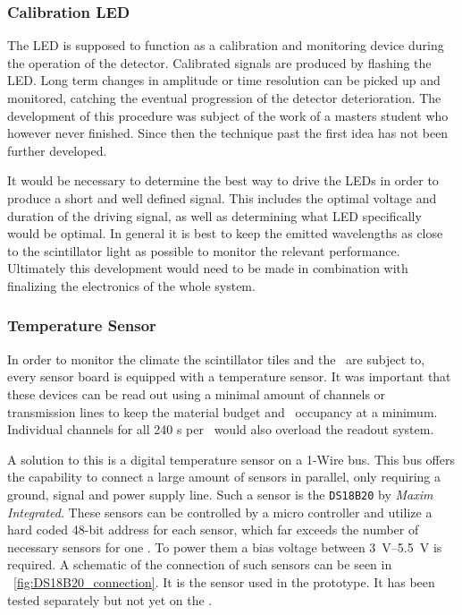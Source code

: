 \documentclass[../BTOF_summary.tex]{subfiles}
\begin{document}
\subsubsection*{Calibration LED}
The LED is supposed to function as a calibration and monitoring device during the operation of the detector.
Calibrated signals are produced by flashing the LED.
Long term changes in amplitude or time resolution can be picked up and monitored, catching the eventual progression of the detector deterioration.
The development of this procedure was subject of the work of a masters student who however never finished.
Since then the technique past the first idea has not been further developed.

It would be necessary to determine the best way to drive the LEDs in order to produce a short and well defined signal. 
This includes the optimal voltage and duration of the driving signal, as well as determining what LED specifically would be optimal.
In general it is best to keep the emitted wavelengths as close to the scintillator light as possible to monitor the relevant performance.
Ultimately this development would need to be made in combination with finalizing the electronics of the whole system.

\subsubsection*{Temperature Sensor}
In order to monitor the climate the scintillator tiles and the \sipms\ are subject to, every sensor board is equipped with a temperature sensor. It was important that these devices can be read out using a minimal amount of channels or transmission lines to keep the material budget and \railboard\ occupancy at a minimum.
Individual channels for all 240 \sensorboard s per \sm\ would also overload the readout system.

A solution to this is a digital temperature sensor on a 1-Wire bus.
This bus offers the capability to connect a large amount of sensors in parallel, only requiring a ground, signal and power supply line.
Such a sensor is the \texttt{DS18B20} by \textit{Maxim Integrated}.
These sensors can be controlled by a micro controller and utilize a hard coded 48-bit address for each sensor, which far exceeds the number of necessary sensors for one \railboard .
To power them a bias voltage between \SIrange[]{3}{5.5}{V} is required.
A schematic of the connection of such sensors can be seen in \fig ~\ref{fig:DS18B20_connection}.
It is the sensor used in the prototype.
It has been tested separately but not yet on the \railboard .
\end{document}
